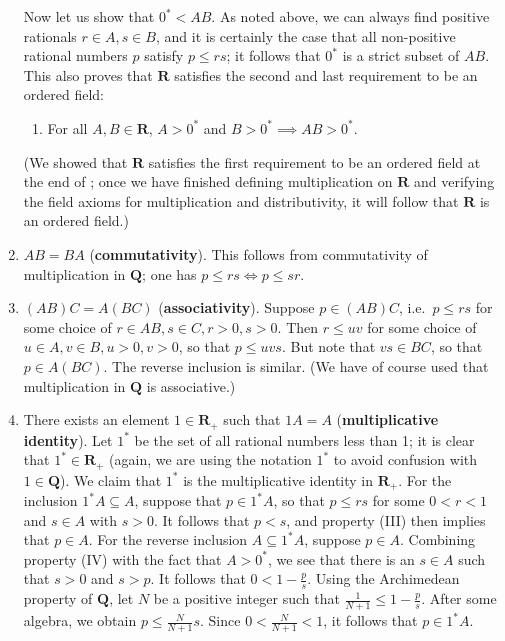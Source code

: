 \documentclass[12pt]{article}
\newcommand{\Q}{\mathbf{Q}}
\newcommand{\R}{\mathbf{R}}
\theoremstyle{definition}
\begin{document}
\begin{enumerate}[label = (M\arabic*)]
    Now let us show that \( 0^* < AB \). As noted above, we can always find positive rationals \( r \in A, s \in B \), and it is certainly the case that all non-positive rational numbers \( p \) satisfy \( p \leq rs \); it follows that \( 0^* \) is a strict subset of \( AB \). This also proves that \( \R \) satisfies the second and last requirement to be an ordered field:
    
    \begin{enumerate}[label = (OF\arabic*), left = 6px, start = 2]
        \item For all \( A, B \in \R \), \( A > 0^* \) and \( B > 0 ^* \implies AB > 0^* \).
    \end{enumerate}
    
    (We showed that \( \R \) satisfies the first requirement to be an ordered field at the end of ; once we have finished defining multiplication on \( \R \) and verifying the field axioms for multiplication and distributivity, it will follow that \( \R \) is an ordered field.)
    
    \item \( AB = BA \) (\textbf{commutativity}). This follows from commutativity of multiplication in \( \Q \); one has \( p \leq rs \iff p \leq sr \).
    
    \item \( (AB)C = A(BC) \) (\textbf{associativity}). Suppose \( p \in (AB)C \), i.e.\ \( p \leq rs \) for some choice of \( r \in AB, s \in C, r > 0, s > 0 \). Then \( r \leq uv \) for some choice of \( u \in A, v \in B, u > 0, v > 0 \), so that \( p \leq uvs \). But note that \( vs \in BC \), so that \( p \in A(BC) \). The reverse inclusion is similar. (We have of course used that multiplication in \( \Q \) is associative.)
    
    \item There exists an element \( 1 \in \R_+ \) such that \( 1A = A \) (\textbf{multiplicative identity}). Let \( 1^* \) be the set of all rational numbers less than 1; it is clear that \( 1^* \in \R_+ \) (again, we are using the notation \( 1^* \) to avoid confusion with \( 1 \in \Q \)). We claim that \( 1^* \) is the multiplicative identity in \( \R_+ \). For the inclusion \( 1^* A \subseteq A \), suppose that \( p \in 1^* A \), so that \( p \leq rs \) for some \( 0 < r < 1 \) and \( s \in A \) with \( s > 0 \). It follows that \( p < s \), and property (III) then implies that \( p \in A \). For the reverse inclusion \( A \subseteq 1^* A \), suppose \( p \in A \). Combining property (IV) with the fact that \( A > 0^* \), we see that there is an \( s \in A \) such that \( s > 0 \) and \( s > p \). It follows that \( 0 < 1 - \frac{p}{s} \). Using the Archimedean property of \( \Q \), let \( N \) be a positive integer such that \( \frac{1}{N+1} \leq 1 - \frac{p}{s} \). After some algebra, we obtain \( p \leq \frac{N}{N+1} s \). Since \( 0 < \frac{N}{N+1} < 1 \), it follows that \( p \in 1^* A \).
    

\end{enumerate}
\end{document}
